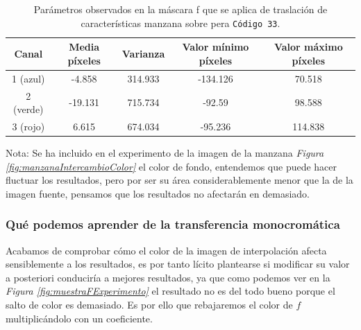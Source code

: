 \documentclass[11pt,twoside,titlepage,a4paper]{article}
\numberwithin{equation}{section} %
\theoremstyle{usual}
\begin{document}
\begin{table}[h!]
\centering
\begin{tabular}{|| c ||c c c c||} 
 \hline
 Canal & Media píxeles & Varianza & Valor mínimo píxeles & Valor máximo píxeles \\ [0.5ex] 
 \hline\hline
 1 (azul) & -4.858 & 314.933 & -134.126 & 70.518 \\ 
 2 (verde) & -19.131  & 715.734 & -92.59 & 98.588 \\
 3 (rojo) & 6.615 & 674.034 & -95.236 & 114.838 \\ [1ex] 
 \hline
\end{tabular}
\caption{Parámetros observados en la máscara f que se aplica de traslación de características manzana sobre pera \texttt{Código 33}.}
\label{table:2}
\end{table}

Nota: Se ha incluido en el experimento de la imagen de la  manzana \textit{Figura \ref{fig:manzanaIntercambioColor}} el color de fondo, entendemos que puede hacer fluctuar los resultados, pero por ser su área considerablemente menor que la de la imagen fuente, pensamos que los resultados no afectarán en demasiado.

\subsubsection{Qué podemos aprender de la transferencia monocromática}

Acabamos de comprobar cómo el color de la imagen de interpolación afecta sensiblemente a los resultados, es por tanto lícito plantearse si modificar su valor a posteriori conduciría a mejores resultados, ya que como podemos ver en la \textit{Figura \ref{fig:muestraFExperimento}} el resultado no es del todo bueno porque el salto de color es demasiado. Es por ello que rebajaremos el color de $f$ multiplicándolo con un coeficiente.
\end{document}
